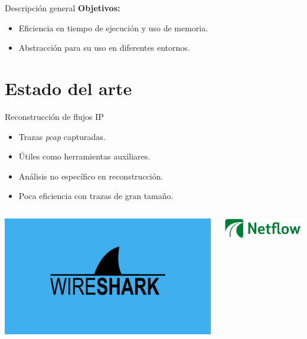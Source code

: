 \documentclass{beamer}
\begin{document}
\begin{frame}{Descripción general}
\textbf{Objetivos:}
\begin{itemize}
    \item Eficiencia en tiempo de ejecución y uso de memoria.
    \item Abstracción para su uso en diferentes entornos.
\end{itemize}
\end{frame}

\section{Estado del arte}
\begin{frame}{Reconstrucción de flujos IP}
\begin{itemize}
    \item Trazas \textit{pcap} capturadas.
    \item Útiles como herramientas auxiliares.
    \item Análisis no específico en reconstrucción.
    \item Poca eficiencia con trazas de gran tamaño.
\end{itemize}
\vskip 0.7cm
\begin{columns}
    \begin{column}{0.3\textwidth}
        \centering
        \includegraphics[scale=0.05]{img/wireshark.png}
    \end{column}
    \begin{column}{0.3\textwidth}
        \includegraphics[scale=0.2]{img/netflow.png}
    \end{column}

\end{columns}
\end{frame}
\end{document}
